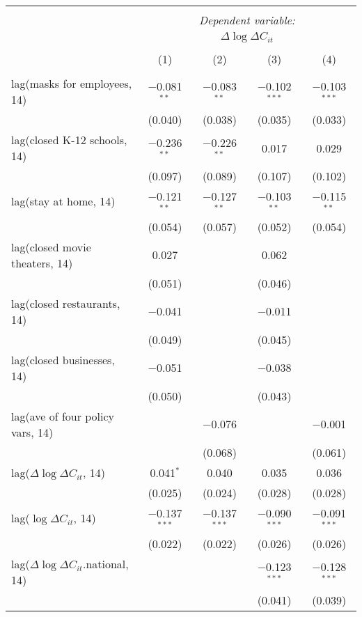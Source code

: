 \begin{tabular}{@{\extracolsep{1pt}}lcccc} 
\\[-1.8ex]\hline 
\hline \\[-1.8ex] 
 & \multicolumn{4}{c}{\textit{Dependent variable:}} \\ 
\cline{2-5} 
 & \multicolumn{4}{c}{$\Delta \log \Delta C_{it}$} \\ 
\\[-1.8ex] & (1) & (2) & (3) & (4)\\ 
\hline \\[-1.8ex] 
 lag(masks for employees, 14) & $-$0.081$^{**}$ & $-$0.083$^{**}$ & $-$0.102$^{***}$ & $-$0.103$^{***}$ \\ 
  & (0.040) & (0.038) & (0.035) & (0.033) \\ 
  lag(closed K-12 schools, 14) & $-$0.236$^{**}$ & $-$0.226$^{**}$ & 0.017 & 0.029 \\ 
  & (0.097) & (0.089) & (0.107) & (0.102) \\ 
  lag(stay at home, 14) & $-$0.121$^{**}$ & $-$0.127$^{**}$ & $-$0.103$^{**}$ & $-$0.115$^{**}$ \\ 
  & (0.054) & (0.057) & (0.052) & (0.054) \\ 
  lag(closed movie theaters, 14) & 0.027 &  & 0.062 &  \\ 
  & (0.051) &  & (0.046) &  \\ 
  lag(closed restaurants, 14) & $-$0.041 &  & $-$0.011 &  \\ 
  & (0.049) &  & (0.045) &  \\ 
  lag(closed businesses, 14) & $-$0.051 &  & $-$0.038 &  \\ 
  & (0.050) &  & (0.043) &  \\ 
  lag(ave of four policy vars, 14) &  & $-$0.076 &  & $-$0.001 \\ 
  &  & (0.068) &  & (0.061) \\ 
  lag($\Delta \log \Delta C_{it}$, 14) & 0.041$^{*}$ & 0.040 & 0.035 & 0.036 \\ 
  & (0.025) & (0.024) & (0.028) & (0.028) \\ 
  lag($\log \Delta C_{it}$, 14) & $-$0.137$^{***}$ & $-$0.137$^{***}$ & $-$0.090$^{***}$ & $-$0.091$^{***}$ \\ 
  & (0.022) & (0.022) & (0.026) & (0.026) \\ 
  lag($\Delta \log \Delta C_{it}$.national, 14) &  &  & $-$0.123$^{***}$ & $-$0.128$^{***}$ \\ 
  &  &  & (0.041) & (0.039) \\ 

\end{tabular}
